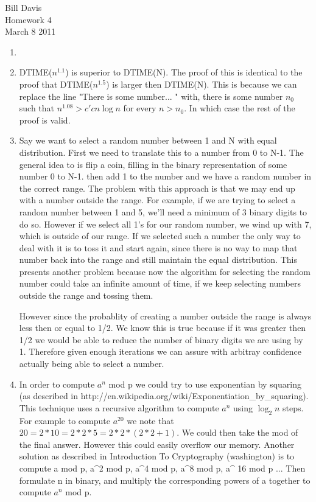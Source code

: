 \documentclass[11pt,fleqn]{article}
\begin{document}
\newcommand{\mbf}[1]{\mbox{{\bfseries #1}}}
\newcommand{\N}{\mbf{N}}
\renewcommand{\O}{\mbf{O}}

\noindent Bill Davis \\
Homework 4 \\
March 8 2011

\begin{enumerate}

\item

\item
DTIME($n^{1.1}$) is superior to DTIME(N). The proof of this is identical to the proof that DTIME($n^{1.5}$) is larger then DTIME(N). This is because we can replace the line "There is some number... " with, there is some number $n_0$ such that $n^{1.08} > c'cn\log n$ for every $n>n_0$. In which case the rest of the proof is valid. 

\item
Say we want to select a random number between 1 and N with equal distribution. First we need to translate this to a number from 0 to N-1. The general idea to is flip a coin, filling in the binary representation of some number 0 to N-1. then add 1 to the number and we have a random number in the correct range. The problem with this approach is that we may end up with a number outside the range. For example, if we are trying to select a random number between 1 and 5, we'll need a minimum of 3 binary digits to do so. However if we select all 1's for our random number, we wind up with 7, which is outside of our range. If we selected such a number the only way to deal with it is to toss it and start again, since there is no way to map that number back into the range and still maintain the equal distribution. This presents another problem because now the algorithm for selecting the random number could take an infinite amount of time, if we keep selecting numbers outside the range and tossing them.

However since the probablity of creating a number outside the range is always less then or equal to 1/2. We know this is true because if it was greater then 1/2 we would be able to reduce the number of binary digits we are using by 1. Therefore given enough iterations we can assure with arbitray confidence actually being able to select a number.   

\item
In order to compute $a^n$ mod p we could try to use exponentian by squaring  (as described in http://en.wikipedia.org/wiki/Exponentiation_by_squaring). This technique uses a recursive algorithm to compute $a^n$ using $\log_2 n$ steps. For example to compute $a^20$ we note that $20=2*10 = 2*2*5 = 2*2*(2*2+1)$. We could then take the mod of the final answer. However this could easily overflow our memory. Another solution as described in Introduction To Cryptography (washington) is to compute a mod p, a^2 mod p, a^4 mod p, a^8 mod p, a^ 16 mod p ... Then formulate n in binary, and multiply the corresponding powers of a together to compute $a^n$ mod p. 


\end{enumerate}
\end{document}

